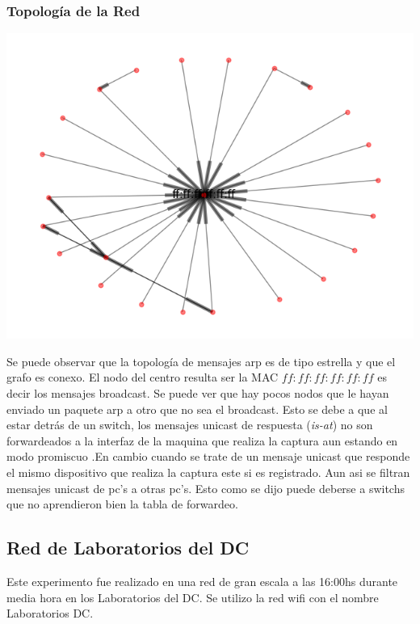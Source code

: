 \subsubsection{Topolog\'ia de la Red}
\begin{center}
 \includegraphics[scale=0.6]{../plots/trabajo_s2_topologia.png}
\end{center}

Se puede observar que la topología de mensajes arp es de tipo estrella
y que el grafo es conexo. El nodo del centro resulta ser la MAC $ff:ff:ff:ff:ff:ff$
es decir los mensajes broadcast. Se puede ver que hay pocos nodos que le hayan
enviado un paquete arp a otro que no sea el broadcast. Esto se debe
a que al estar detrás de un switch, los mensajes unicast de respuesta (\textit{is-at})
no son forwardeados a la interfaz de la maquina que realiza la captura aun estando en modo promiscuo
.En cambio cuando se trate de un mensaje unicast que responde el mismo dispositivo que
realiza la captura este si es registrado. Aun asi se filtran mensajes unicast de pc's a otras pc's. Esto como
se dijo puede deberse a switchs que no aprendieron bien la tabla de forwardeo.

\subsection{Red de Laboratorios del DC}

Este experimento fue realizado en una red de gran escala a las 16:00hs durante media hora en los Laboratorios del DC.
Se utilizo la red wifi con el nombre Laboratorios DC.

